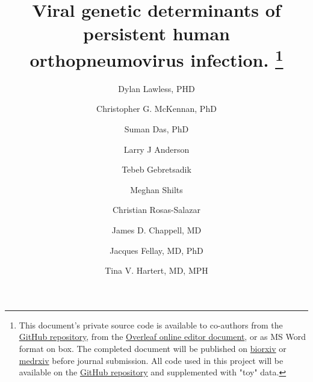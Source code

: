 \documentclass{article}
\begin{document}
\date{} %
\title{\Large \bf Viral genetic determinants of persistent human orthopneumovirus infection.
\footnote{This document's private source code is available to co-authors from the 
\href{https://github.com/DylanLawless/inspire_manscript}{GitHub repository}, from the 
\href{https://www.overleaf.com/project/61718a4e077acc3d20ee68f1}{Overleaf online editor document}, or as MS Word format on box. The completed document will be published on 
\href{https://www.biorxiv.org}{biorxiv} or \href{https://www.medrxiv.org}{medrxiv} before journal submission.
All code used in this project will be available on the 
\href{https://github.com/DylanLawless/inspire_manscript}{GitHub repository} and supplemented with "toy" data.}
}

\author[epfl]{\rm Dylan Lawless, PHD}
\author[penn]{\rm Christopher G. McKennan, PhD}
\author[]{\rm Suman Das, PhD}
\author[emoryPed]{\rm Larry J Anderson}
\author[bioVan]{\rm  Tebeb Gebretsadik}
\author[]{\rm Meghan Shilts}
\author[]{\rm Christian Rosas-Salazar}
\author[pedVan]{\rm James D. Chappell, MD}
\author[epfl]{\rm Jacques Fellay, MD, PhD }
\author[pedVan,medVan]{\rm Tina V. Hartert, MD, MPH}

\maketitle

\end{document}
